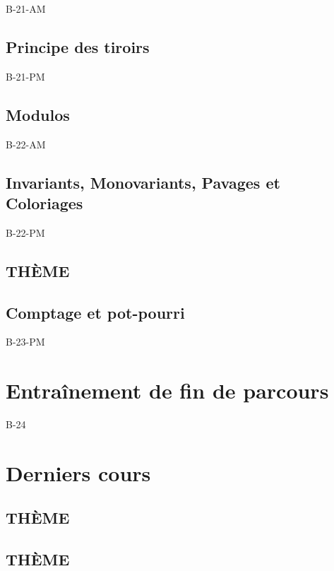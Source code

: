 \documentclass[poly,trombi]{valbonne}
\begin{document}
{B-21-AM}

\subsection{Principe des tiroirs}

{B-21-PM}

\subsection{Modulos}
{B-22-AM}

\subsection{Invariants, Monovariants, Pavages et Coloriages}

{B-22-PM}

\subsection{THÈME}


\subsection{Comptage et pot-pourri}

{B-23-PM}


\section{Entraînement de fin de parcours}

{B-24}


\section{Derniers cours}

\subsection{THÈME}


\subsection{THÈME}
\end{document}
